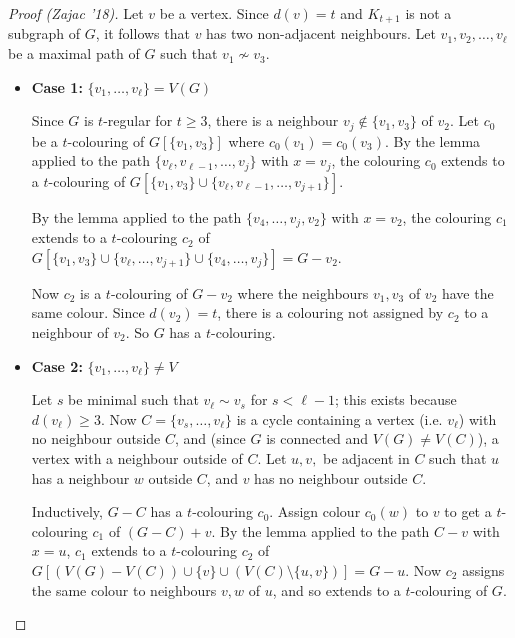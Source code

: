 \documentclass[main.tex]{subfiles}
\begin{document}
\begin{proof}[Proof (Zajac '18)]
  Let $v$ be a vertex.
  Since $d(v) = t$ and $K_{t+1}$ is not a subgraph of $G$, it follows that $v$
  has two non-adjacent neighbours.
  Let $v_1, v_2, \ldots, v_\ell$ be a maximal path of $G$ such that
  $v_1\not\sim v_3$.

  \begin{itemize}
    \item \textbf{Case 1:} $\{v_1,\ldots,v_\ell\} = V(G)$

      Since $G$ is $t$-regular for $t\geq 3$, there is a neighbour
      $v_j\notin\{v_1,v_3\}$ of $v_2$.
      Let $c_0$ be a $t$-colouring of $G[\{v_1,v_3\}]$ where $c_0(v_1) = c_0(v_3)$.
      By the lemma applied to the path $\{v_\ell, v_{\ell-1},\ldots,v_j\}$ with
      $x = v_j$, the colouring $c_0$ extends to a $t$-colouring of
      $G[\{v_1,v_3\}\cup\{v_\ell, v_{\ell-1},\ldots,v_{j+1}\}]$.

      By the lemma applied to the path $\{v_4, \ldots, v_j, v_2\}$ with $x = v_2$,
      the colouring $c_1$ extends to a $t$-colouring $c_2$ of
      $G[\{v_1,v_3\}\cup\{v_\ell,\ldots,v_{j+1}\}\cup\{v_4,\ldots,v_j\}] = G - v_2$.

      Now $c_2$ is a $t$-colouring of $G - v_2$ where the neighbours $v_1,v_3$
      of $v_2$ have the same colour.
      Since $d(v_2) = t$, there is a colouring not assigned by $c_2$ to a
      neighbour of $v_2$.
      So $G$ has a $t$-colouring.

    \item \textbf{Case 2:} $\{v_1,\ldots,v_\ell\}\neq V$

      Let $s$ be minimal such that $v_\ell\sim v_s$ for $s < \ell - 1$;
      this exists because $d(v_\ell)\geq 3$.
      Now $C = \{v_s,\ldots,v_\ell\}$ is a cycle containing a vertex (i.e. $v_\ell$)
      with no neighbour outside $C$, and (since $G$ is connected and $V(G)\neq V(C)$),
      a vertex with a neighbour outside of $C$.
      Let $u,v,$ be adjacent in $C$ such that
      $u$ has a neighbour $w$ outside $C$, and $v$ has no neighbour outside $C$.

      Inductively, $G - C$ has a $t$-colouring $c_0$.
      Assign colour $c_0(w)$ to $v$ to get a $t$-colouring $c_1$ of $(G - C) + v$.
      By the lemma applied to the path $C - v$ with $x = u$,
      $c_1$ extends to a $t$-colouring $c_2$ of
      $G[(V(G) - V(C))\cup\{v\}\cup(V(C)\setminus\{u,v\})] = G - u$.
      Now $c_2$ assigns the same colour to neighbours $v,w$ of $u$,
      and so extends to a $t$-colouring of $G$. \qedhere
  \end{itemize}
\end{proof}
\end{document}
